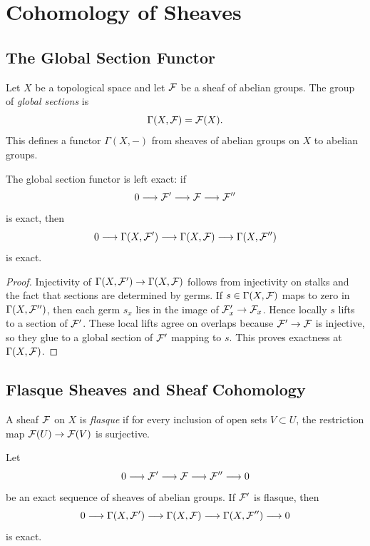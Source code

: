 \chapter{Cohomology of Sheaves}

\section{The Global Section Functor}

\begin{definition}
Let \(X\) be a topological space and let \(\mathcal{F}\) be a sheaf of abelian groups.
The group of \emph{global sections} is
\[
    \Gamma(X,\mathcal{F})=\mathcal{F}(X).
\]
This defines a functor \(\Gamma(X,-)\) from sheaves of abelian groups on \(X\)
to abelian groups.
\end{definition}

\begin{proposition}
The global section functor is left exact: if
\[
    0\longrightarrow \mathcal{F}'\longrightarrow \mathcal{F}\longrightarrow \mathcal{F}''
\]
is exact, then
\[
    0\longrightarrow \Gamma(X,\mathcal{F}')\longrightarrow \Gamma(X,\mathcal{F})
    \longrightarrow \Gamma(X,\mathcal{F}'')
\]
is exact.
\end{proposition}

\begin{proof}
Injectivity of \(\Gamma(X,\mathcal{F}')\to\Gamma(X,\mathcal{F})\) follows from injectivity on
stalks and the fact that sections are determined by germs.  If
\(s\in\Gamma(X,\mathcal{F})\) maps to zero in \(\Gamma(X,\mathcal{F}'')\), then each germ
\(s_x\) lies in the image of \(\mathcal{F}'_x\to\mathcal{F}_x\).  Hence locally \(s\) lifts to a
section of \(\mathcal{F}'\).  These local lifts agree on overlaps because
\(\mathcal{F}'\to\mathcal{F}\) is injective, so they glue to a global section of \(\mathcal{F}'\)
mapping to \(s\).  This proves exactness at \(\Gamma(X,\mathcal{F})\).
\end{proof}

\section{Flasque Sheaves and Sheaf Cohomology}

\begin{definition}
A sheaf \(\mathcal{F}\) on \(X\) is \emph{flasque} if for every inclusion of open sets
\(V\subset U\), the restriction map \(\mathcal{F}(U)\to\mathcal{F}(V)\) is surjective.
\end{definition}

\begin{lemma}
Let
\[
    0\longrightarrow \mathcal{F}'\longrightarrow \mathcal{F}\longrightarrow \mathcal{F}''
    \longrightarrow 0
\]
be an exact sequence of sheaves of abelian groups.  If \(\mathcal{F}'\) is flasque, then
\[
    0\longrightarrow \Gamma(X,\mathcal{F}')\longrightarrow \Gamma(X,\mathcal{F})
    \longrightarrow \Gamma(X,\mathcal{F}'')\longrightarrow 0
\]
is exact.
\end{lemma}

